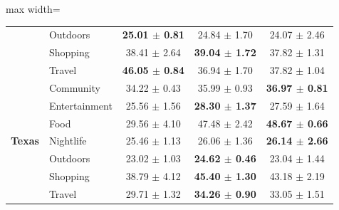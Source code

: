 \begin{table}[htbp]
\begin{adjustbox}{max width=\textwidth}
\begin{tabular}{clccc}
 & Outdoors & \textbf{25.01 $\pm$ 0.81} & 24.84 $\pm$ 1.70 & 24.07 $\pm$ 2.46 \\
 & Shopping & 38.41 $\pm$ 2.64 & \textbf{39.04 $\pm$ 1.72} & 37.82 $\pm$ 1.31 \\
 & Travel & \textbf{46.05 $\pm$ 0.84} & 36.94 $\pm$ 1.70 & 37.82 $\pm$ 1.04 \\
\midrule
\multirow{7}{*}{\textbf{Texas}} & Community & 34.22 $\pm$ 0.43 & 35.99 $\pm$ 0.93 & \textbf{36.97 $\pm$ 0.81} \\
 & Entertainment & 25.56 $\pm$ 1.56 & \textbf{28.30 $\pm$ 1.37} & 27.59 $\pm$ 1.64 \\
 & Food & 29.56 $\pm$ 4.10 & 47.48 $\pm$ 2.42 & \textbf{48.67 $\pm$ 0.66} \\
 & Nightlife & 25.46 $\pm$ 1.13 & 26.06 $\pm$ 1.36 & \textbf{26.14 $\pm$ 2.66} \\
 & Outdoors & 23.02 $\pm$ 1.03 & \textbf{24.62 $\pm$ 0.46} & 23.04 $\pm$ 1.44 \\
 & Shopping & 38.79 $\pm$ 4.12 & \textbf{45.40 $\pm$ 1.30} & 43.18 $\pm$ 2.19 \\
 & Travel & 29.71 $\pm$ 1.32 & \textbf{34.26 $\pm$ 0.90} & 33.05 $\pm$ 1.51 \\
\bottomrule
\end{tabular}
\end{adjustbox}
\end{table}
